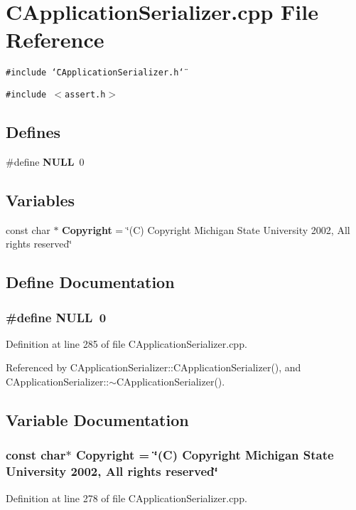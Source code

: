 \section{CApplication\-Serializer.cpp File Reference}
\label{CApplicationSerializer_8cpp}
{\tt \#include \char`\"{}CApplication\-Serializer.h\char`\"{}}\par
{\tt \#include $<$assert.h$>$}\par
\subsection*{Defines}
\begin{CompactItemize}
\item 
\#define {\bf NULL}\ 0
\end{CompactItemize}
\subsection*{Variables}
\begin{CompactItemize}
\item 
const char $\ast$ {\bf Copyright} = \char`\"{}(C) Copyright Michigan State University 2002, All rights reserved\char`\"{}
\end{CompactItemize}


\subsection{Define Documentation}
\subsubsection{\setlength{\rightskip}{0pt plus 5cm}\#define NULL\ 0}\label{CApplicationSerializer_8cpp_a0}




Definition at line 285 of file CApplication\-Serializer.cpp.

Referenced by CApplication\-Serializer::CApplication\-Serializer(), and CApplication\-Serializer::$\sim$CApplication\-Serializer().

\subsection{Variable Documentation}
\subsubsection{\setlength{\rightskip}{0pt plus 5cm}const char$\ast$ Copyright = \char`\"{}(C) Copyright Michigan State University 2002, All rights reserved\char`\"{}\hspace{0.3cm}{\tt  [static]}}\label{CApplicationSerializer_8cpp_a1}




Definition at line 278 of file CApplication\-Serializer.cpp.